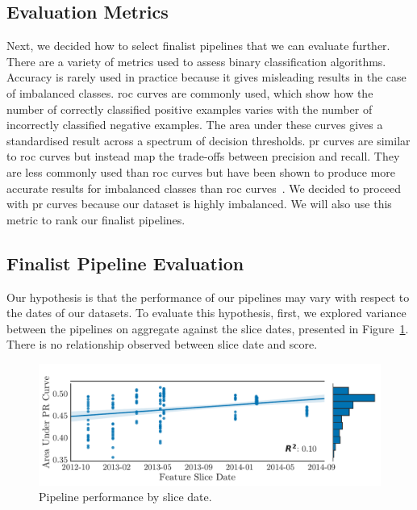 \documentclass[../thesis/thesis.tex]{subfiles}
\begin{document}
\subsection{Evaluation Metrics}

Next, we decided how to select finalist pipelines that we can evaluate further. There are a variety of metrics used to assess binary classification algorithms. Accuracy is rarely used in practice because it gives misleading results in the case of imbalanced classes. \Gls{roc} curves are commonly used, which show how the number of correctly classified positive examples varies with the number of incorrectly classified negative examples. The area under these curves gives a standardised result across a spectrum of decision thresholds. \Gls{pr} curves are similar to \gls{roc} curves but instead map the trade-offs between precision and recall. They are less commonly used than \gls{roc} curves but have been shown to produce more accurate results for imbalanced classes than \gls{roc} curves~\cite{davis2006}. We decided to proceed with \gls{pr} curves because our dataset is highly imbalanced. We will also use this metric to rank our finalist pipelines.

\subsection{Finalist Pipeline Evaluation}

Our hypothesis is that the performance of our pipelines may vary with respect to the dates of our datasets. To evaluate this hypothesis, first, we explored variance between the pipelines on aggregate against the slice dates, presented in Figure~\ref{fig:design:selection_agg_slice}. There is no relationship observed between slice date and score.

\begin{figure}[!htb]
    \centering
    \includegraphics[width=\textwidth]{../figures/design/auc_finalists_agg}
    \caption[Pipeline performance by slice date]{Pipeline performance by slice date.}
    \label{fig:design:selection_agg_slice}
\end{figure}
\end{document}

